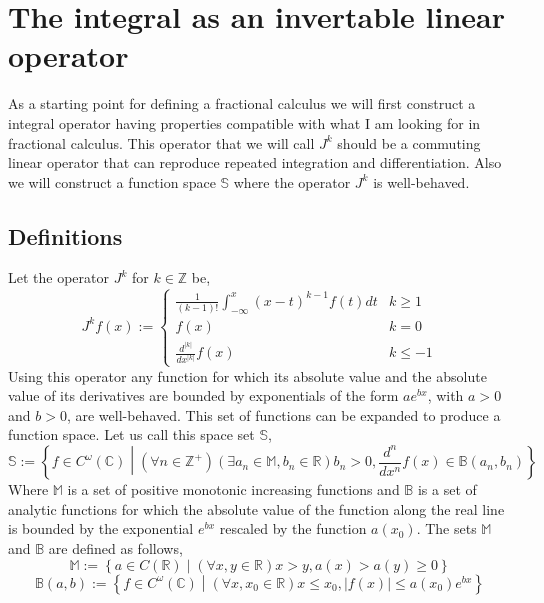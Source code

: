 \documentclass[%
 onecolumn,
 amsmath, amssymb, aps, pra, 10pt
]{revtex4-2}
\begin{document}
\appendix*
\section{The integral as an invertable linear operator}
As a starting point for defining a fractional calculus we will first construct a integral operator having properties compatible with what I am looking for in fractional calculus. This operator that we will call $J^k$ should be a commuting linear operator that can reproduce repeated integration and differentiation. Also we will construct a function space $\mathbb{S}$ where the operator $J^k$ is well-behaved.

\subsection{Definitions}
Let the operator $J^k$ for $k \in \mathbb{Z}$ be,
\begin{equation}
J^k f(x) := \begin{cases} \frac{1}{(k-1)!}\int_{-\infty}^x (x - t)^{k - 1}f(t)dt & k \geq 1 \\ f(x) & k = 0 \\ \frac{d^{\left|k\right|}}{dx^{\left|k\right|}}f(x) & k \leq -1 \end{cases}
\label{integer_calculus}
\end{equation}
Using this operator any function for which its absolute value and the absolute value of its derivatives are bounded by exponentials of the form $ae^{bx}$, with $a > 0$ and $b > 0$, are well-behaved. This set of functions can be expanded to produce a function space. Let us call this space set $\mathbb{S}$,
\begin{equation}
\mathbb{S} := \left\lbrace f \in C^\omega(\mathbb{C}) \middle| (\forall n \in \mathbb{Z}^+)(\exists a_n \in \mathbb{M}, b_n \in \mathbb{R}) b_n > 0, \frac{d^n}{dx^n}f(x) \in \mathbb{B}(a_n, b_n) \right\rbrace
\label{exponentialy_bounded}
\end{equation}
Where $\mathbb{M}$ is a set of positive monotonic increasing functions and $\mathbb{B}$ is a set of analytic functions for which the absolute value of the function along the real line is bounded by the exponential $e^{bx}$ rescaled by the function $a(x_0)$. The sets $\mathbb{M}$ and $\mathbb{B}$ are defined as follows,
\[\mathbb{M} := \left\lbrace a \in C(\mathbb{R}) \middle| (\forall x, y \in \mathbb{R}) x > y, a(x) > a(y) \geq 0 \right\rbrace\]
\[\mathbb{B}(a, b) := \left\lbrace f \in C^\omega(\mathbb{C}) \middle| (\forall x, x_0 \in \mathbb{R}) x \leq x_0, |f(x)| \leq a(x_0)e^{bx} \right\rbrace\]
\end{document}
